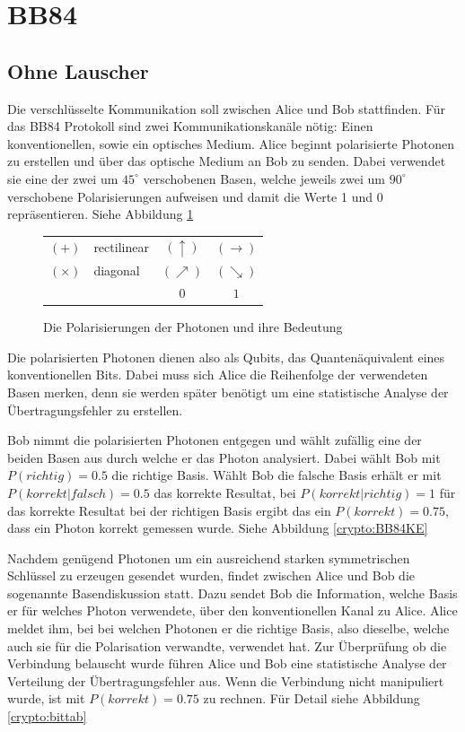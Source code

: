 \section{BB84}

  \subsection{Ohne Lauscher}
  Die verschl\"usselte Kommunikation soll zwischen Alice und Bob stattfinden.
  F\"ur das BB84 Protokoll sind zwei Kommunikationskan\"ale n\"otig:
  Einen konventionellen, sowie ein optisches Medium.
  Alice beginnt polarisierte Photonen zu erstellen und \"uber das optische Medium an Bob zu senden.
  Dabei verwendet sie eine der zwei um $45^{\circ}$ verschobenen Basen,
  welche jeweils zwei um $90^{\circ}$ verschobene Polarisierungen aufweisen und damit die Werte 1 und 0 repr\"asentieren. Siehe Abbildung \ref{crypto:poltab}

  \begin{figure}
    \centering
    \begin{tabular}{l l || c c}
      \hline
      $(+)$ & rectilinear & $(\uparrow)$ & $(\rightarrow)$\\
      $(\times)$ & diagonal & $(\nearrow)$ & $(\searrow)$\\
      \hline
      & & $0$ & $1$\\
      \hline
    \end{tabular}
    \caption{Die Polarisierungen der Photonen und ihre Bedeutung\label{crypto:poltab}}
  \end{figure}

  Die polarisierten Photonen dienen also als Qubits, das Quanten\"aquivalent eines konventionellen Bits.
  Dabei muss sich Alice die Reihenfolge der verwendeten Basen merken,
  denn sie werden sp\"ater ben\"otigt um eine statistische Analyse der \"Ubertragungsfehler zu erstellen.

  Bob nimmt die polarisierten Photonen entgegen und w\"ahlt zuf\"allig eine der beiden Basen aus durch welche er das Photon analysiert.
  Dabei w\"ahlt Bob mit
  $P(richtig)=0.5$
  die richtige Basis.
  W\"ahlt Bob die falsche Basis erh\"alt er mit
  $P(korrekt|falsch)=0.5$
  das korrekte Resultat, bei
  $P(korrekt|richtig)=1$
  f\"ur das korrekte Resultat bei der richtigen Basis ergibt das ein
  $P(korrekt)=0.75$,
  dass ein Photon korrekt gemessen wurde.
  Siehe Abbildung \ref{crypto:BB84KE}

  Nachdem gen\"ugend Photonen um ein ausreichend starken symmetrischen Schl\"ussel zu erzeugen gesendet wurden, findet zwischen Alice und Bob die sogenannte Basendiskussion statt.
  Dazu sendet Bob die Information, welche Basis er f\"ur welches Photon verwendete, \"uber den konventionellen Kanal zu Alice.
  Alice meldet ihm, bei bei welchen Photonen er die richtige Basis, also dieselbe, welche auch sie f\"ur die Polarisation verwandte, verwendet hat.
  Zur \"Uberpr\"ufung ob die Verbindung belauscht wurde f\"uhren Alice und Bob eine statistische Analyse der Verteilung der \"Ubertragungsfehler aus.
  Wenn die Verbindung nicht manipuliert wurde, ist mit $P(korrekt)=0.75$ zu rechnen.
  F\"ur Detail siehe Abbildung \ref{crypto:bittab}

